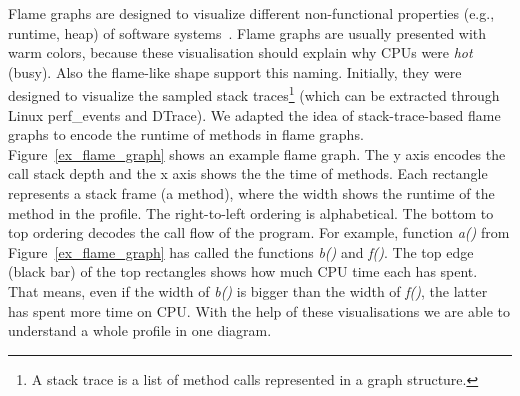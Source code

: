 Flame graphs are designed to visualize different non-functional properties (e.g., runtime, heap) of software systems~\cite{Gregg:2016:FG:2927299.2927301}. Flame graphs are usually presented with warm colors, because these visualisation should explain why CPUs were \textit{hot} (busy). Also the flame-like shape support this naming. Initially, they were designed to visualize the sampled stack traces\footnote{A stack trace is a list of method calls represented in a graph structure.} (which can be extracted through Linux perf\_events and DTrace). We adapted the idea of stack-trace-based flame graphs to encode the runtime of methods in flame graphs. Figure~\ref{ex_flame_graph} shows an example flame graph. The y axis encodes the call stack depth and the x axis shows the the time of methods. Each rectangle represents a stack frame (a method), where the width shows the runtime of the method in the profile. The right-to-left ordering is alphabetical. The bottom to top ordering decodes the call flow of the program. For example, function \textit{a()} from Figure~\ref{ex_flame_graph} has called the functions \textit{b()} and \textit{f()}. The top edge (black bar) of the top rectangles shows how much CPU time each has spent. That means, even if the width of \textit{b()} is bigger than the width of \textit{f()}, the latter has spent more time on CPU. With the help of these visualisations we are able to understand a whole profile in one diagram.

